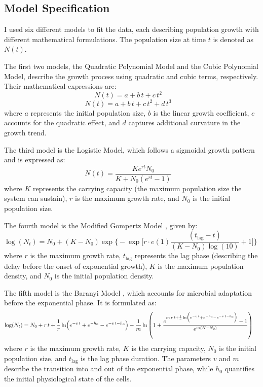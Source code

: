 \documentclass[12pt]{article}
\begin{document}
\subsection{Model Specification}


I used six different models to fit the data, each describing population growth with different mathematical formulations. The population size at time \(t\) is denoted as \(N(t)\).

The first two models, the Quadratic Polynomial Model and the Cubic Polynomial Model, describe the growth process using quadratic and cubic terms, respectively. Their mathematical expressions are:
\begin{equation}
N(t) = a + b\,t + c\,t^2 \quad 
\end{equation}
\begin{equation}
N(t) = a + b\,t + c\,t^2 + d\,t^3 \quad 
\end{equation}
where \(a\) represents the initial population size, \(b\) is the linear growth coefficient, \(c\) accounts for the quadratic effect, and \(d\) captures additional curvature in the growth trend.

The third model is the Logistic Model, which follows a sigmoidal growth pattern and is expressed as:
\begin{equation}
N(t) = \frac{K e^{r t} N_0}{K + N_0(e^{r t} - 1)} \quad 
\end{equation}
where \(K\) represents the carrying capacity (the maximum population size the system can sustain), \(r\) is the maximum growth rate, and \(N_0\) is the initial population size.

The fourth model is the Modified Gompertz Model \citep{Zwietering1990}, given by:
\begin{equation}
\log(N_t) = N_0 + (K - N_0) \exp \Biggl\{ -\exp \Biggl[ r \cdot e(1) \frac{(t_{\mathrm{lag}} - t)}{(K - N_0)\log(10)} + 1 \Biggr] \Biggr\} \quad 
\end{equation}
where \(r\) is the maximum growth rate, \(t_{\text{lag}}\) represents the lag phase (describing the delay before the onset of exponential growth), \(K\) is the maximum population density, and \(N_0\) is the initial population density.

The fifth model is the Baranyi Model \citep{BaranyiRoberts1994}, which accounts for microbial adaptation before the exponential phase. It is formulated as:
\begin{equation}
\log(N_t) = N_0 + r\,t + \frac{1}{r} \ln\Bigl(e^{-v\,t} + e^{-h_0} - e^{-v\,t-h_0}\Bigr) - \frac{1}{m} \ln \left( 1 + \frac{e^{m\,r\,t + \frac{1}{r}\ln\Bigl(e^{-v\,t} + e^{-h_0} - e^{-v\,t-h_0}\Bigr)} - 1}{e^{m(K - N_0)}} \right) \quad 
\end{equation}
where \(r\) is the maximum growth rate, \(K\) is the carrying capacity, \(N_0\) is the initial population size, and \(t_{\text{lag}}\) is the lag phase duration. The parameters \(v\) and \(m\) describe the transition into and out of the exponential phase, while \(h_0\) quantifies the initial physiological state of the cells.
\end{document}
